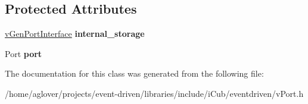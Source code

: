 \subsection*{Protected Attributes}
\begin{DoxyCompactItemize}
\item 
\hyperlink{classev_1_1vGenPortInterface}{v\+Gen\+Port\+Interface} {\bfseries internal\+\_\+storage}\hypertarget{classev_1_1vGenWritePort_a20d04c006e2102f0c5644f65f0752aef}{}\label{classev_1_1vGenWritePort_a20d04c006e2102f0c5644f65f0752aef}

\item 
Port {\bfseries port}\hypertarget{classev_1_1vGenWritePort_a35515d9989a3f50be6a8cf2666185623}{}\label{classev_1_1vGenWritePort_a35515d9989a3f50be6a8cf2666185623}

\end{DoxyCompactItemize}


The documentation for this class was generated from the following file\+:\begin{DoxyCompactItemize}
\item 
/home/aglover/projects/event-\/driven/libraries/include/i\+Cub/eventdriven/v\+Port.\+h\end{DoxyCompactItemize}
